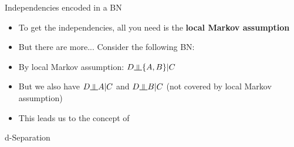 \begin{frame}{Independencies encoded in a BN}{}
	\begin{itemize}
		\item To get the independencies, all you need is the \textbf{local Markov assumption}
		\item But there are more... Consider the following BN:
		\vspace*{1mm}
		
		\vspace*{1mm}
		\item By local Markov assumption: $D \indep \{A, B\} \vert C$
		\item But we also have $D \indep A \vert C$ and $D \indep B \vert C$
			{\footnotesize (not covered by local Markov assumption)}
		\item This leads us to the concept of 
	\end{itemize}
\end{frame}


\begin{frame}{d-Separation}{}

	\vfill
\end{frame}


